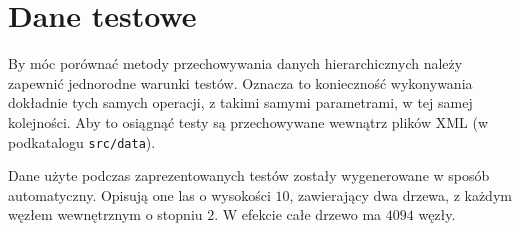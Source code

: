 


% 



\section*{Dane testowe}

By móc porównać metody przechowywania danych hierarchicznych należy zapewnić jednorodne warunki testów.
Oznacza to konieczność wykonywania dokładnie tych samych operacji, z takimi samymi parametrami, w tej samej kolejności.
Aby to osiągnąć testy są przechowywane wewnątrz plików XML (w podkatalogu \verb|src/data|).


Dane użyte podczas zaprezentowanych testów zostały wygenerowane w sposób automatyczny.
Opisują one las o wysokości $10$, zawierający dwa drzewa, 
z każdym węzłem wewnętrznym o stopniu $2$.
W efekcie całe drzewo ma $4094$ węzły.





